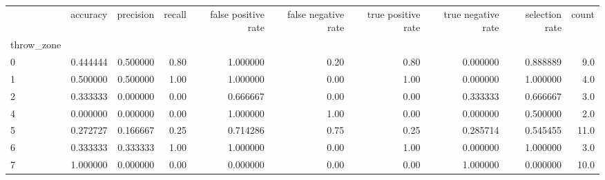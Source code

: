 \begin{tabular}{lrrrrrrrrr}
\toprule
{} &  accuracy &  precision &  recall &  false positive rate &  false negative rate &  true positive rate &  true negative rate &  selection rate &  count \\
throw\_zone &           &            &         &                      &                      &                     &                     &                 &        \\
\midrule
0          &  0.444444 &   0.500000 &    0.80 &             1.000000 &                 0.20 &                0.80 &            0.000000 &        0.888889 &    9.0 \\
1          &  0.500000 &   0.500000 &    1.00 &             1.000000 &                 0.00 &                1.00 &            0.000000 &        1.000000 &    4.0 \\
2          &  0.333333 &   0.000000 &    0.00 &             0.666667 &                 0.00 &                0.00 &            0.333333 &        0.666667 &    3.0 \\
4          &  0.000000 &   0.000000 &    0.00 &             1.000000 &                 1.00 &                0.00 &            0.000000 &        0.500000 &    2.0 \\
5          &  0.272727 &   0.166667 &    0.25 &             0.714286 &                 0.75 &                0.25 &            0.285714 &        0.545455 &   11.0 \\
6          &  0.333333 &   0.333333 &    1.00 &             1.000000 &                 0.00 &                1.00 &            0.000000 &        1.000000 &    3.0 \\
7          &  1.000000 &   0.000000 &    0.00 &             0.000000 &                 0.00 &                0.00 &            1.000000 &        0.000000 &   10.0 \\
\bottomrule
\end{tabular}
